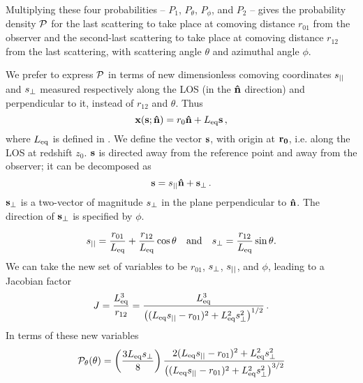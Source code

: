 \documentclass[fleqn,usenatbib]{mnras}
\begin{document}
    Multiplying these four probabilities -- $P_1$, $P_\theta$, $P_\phi$, and
    $P_2$ -- gives the probability density $\mathcal{P}$ for the last scattering to
    take place at comoving distance $r_{01}$ from the observer and the
    second-last scattering to take place at comoving distance $r_{12}$ from the
    last scattering, with scattering angle $\theta$ and azimuthal angle $\phi$.

    We prefer to express $\mathcal{P}$ in terms of new dimensionless comoving
    coordinates $s_{||}$ and $s_{\perp}$ measured respectively along the LOS (in the
    ${\bf\hat{n}}$ direction) and perpendicular to it, instead of $r_{12}$ and
    $\theta$.%
    Thus
    \begin{equation} \label{eq:xofs}
        \mathbf{x}(\mathbf{s};{\bf\hat{n}}) = r_0 {\bf\hat{n}} + L_{\rm eq}\mathbf{s}\,,
    \end{equation}
    where $L_{\rm eq}$ is defined in .  We define the
    vector $\mathbf{s}$, with origin at $\mathbf{r_0}$, i.e. along the LOS at redshift
    $z_0$.  $\mathbf{s}$ is directed away from the reference point and away from
    the observer; it can be decomposed as
    \begin{equation}
        \mathbf{s} = s_{||} {\bf\hat{n}} + \mathbf{s}_\perp \,.
    \end{equation}
    $\mathbf{s}_\perp$ is a two-vector of magnitude $s_{\perp}$ in the plane
    perpendicular to ${\bf\hat{n}}$.  The direction of $\mathbf{s}_\perp$ is specified by
    $\phi$.

    \begin{equation} \label{eq:s_definition}
        s_{||} = \frac{r_{01}}{L_{\rm eq}} + \frac{r_{12}}{L_{\rm eq}}\cos\theta \quad \mathrm{and}\quad
        s_{\perp} = \frac{r_{12}}{L_{\rm eq}}\sin\theta.
    \end{equation}
    We can take the new set of variables to be $r_{01}$, $s_{\perp}$, $s_{||}$, and
    $\phi$, leading to a Jacobian factor
    \begin{equation} \label{eq:r2s_jacobian}
        J = \frac{L_{\rm eq}^3}{r_{12}}
          = \frac{L_{\rm eq}^3}{\left((L_{\rm eq} s_{||}-r_{01})^2 + L_{\rm eq}^2s_{\perp}^2\right)^{1/2}}\,.
    \end{equation}
    In terms of these new variables
    \begin{equation}
        \mathcal{P}_\theta(\theta)
          = \left( \frac{3L_{\rm eq}s_{\perp}}{8} \right)
            \frac{2(L_{\rm eq} s_{||}-r_{01})^2 + L_{\rm eq}^2s_{\perp}^2}
                 {\left((L_{\rm eq} s_{||}-r_{01})^2 + L_{\rm eq}^2s_{\perp}^2\right)^{3/2}}
    \end{equation}
\end{document}
